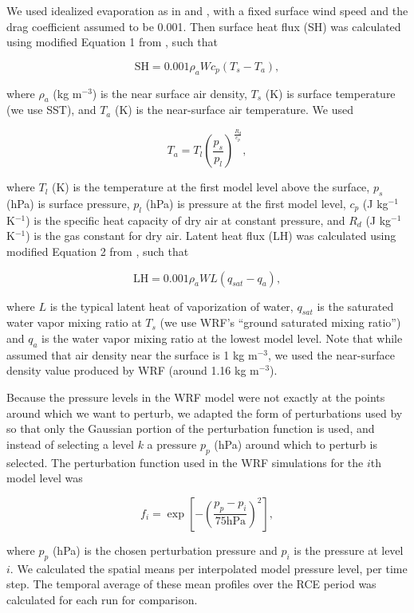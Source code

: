 \documentclass[draft]{agujournal2019}
\begin{document}
We used idealized evaporation as in  and
, with a fixed surface wind speed and the drag
coefficient assumed to be 0.001. Then surface heat flux (SH) was calculated
using modified Equation 1 from , such that

$$
\textrm{SH} = 0.001 \rho_a W c_p (T_s - T_a),
$$

\noindent where $\rho_a$ (kg m$^{-3}$) is the near surface air density, $T_s$
(K) is surface temperature (we use SST), and $T_a$ (K) is the near-surface air
temperature. We used 

$$
T_a = T_l \left(\frac{p_s}{p_l}\right)^{\frac{R_d}{c_p}},
$$

\noindent where $T_l$ (K) is the temperature at the first model level above the
surface, $p_s$ (hPa) is surface pressure, $p_l$ (hPa) is pressure at the first
model level, $c_p$ (J kg$^{-1}$ K$^{-1}$) is the specific heat capacity of dry
air at constant pressure, and $R_d$ (J kg$^{-1}$ K$^{-1}$) is the gas constant
for dry air. Latent heat flux (LH) was calculated using modified Equation 2 from
, such that

$$
\textrm{LH} = 0.001 \rho_a W L (q_{sat} - q_a),
$$

\noindent where $L$ is the typical latent heat of vaporization of water,
$q_{sat}$ is the saturated water vapor mixing ratio at $T_s$ (we use WRF's
``ground saturated mixing ratio'') and $q_a$ is the water vapor mixing ratio at
the lowest model level. Note that while  assumed that air
density near the surface is 1 kg m$^{-3}$, we used the near-surface density
value produced by WRF (around 1.16 kg m$^{-3}$).

Because the pressure levels in the WRF model were not exactly at the points
around which we want to perturb, we adapted the form of perturbations used by
 so that only the Gaussian portion of the perturbation
function is used, and instead of selecting a level $k$ a pressure $p_p$ (hPa)
around which to perturb is selected. The perturbation function used in the WRF
simulations for the $i$th model level was

$$
f_i = \exp\left[ - \left( \frac{p_p - p_i}{75 \textrm{hPa}}\right)^2 \right],
$$

\noindent where $p_p$ (hPa) is the chosen perturbation pressure and $p_i$ is the
pressure at level $i$. We calculated the spatial means per interpolated model
pressure level, per time step. The temporal average of these mean profiles over
the RCE period was calculated for each run for comparison.
\end{document}
